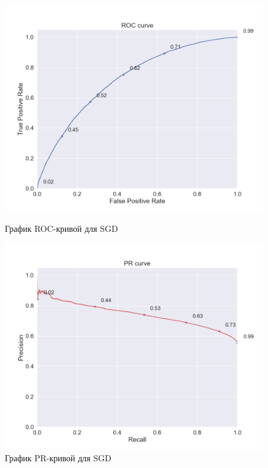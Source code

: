 \begin{figure}[h!]
\centering
\begin{minipage}{.5\textwidth}
\centering
\includegraphics[width=1.0\linewidth]{images/sgd/roc_curve}
\caption{График ROC-кривой для SGD}
\label{fig:sgd_roc}
\end{minipage}%
\begin{minipage}{.5\textwidth}
\centering
\includegraphics[width=1.0\linewidth]{images/sgd/pr_curve}
\caption{График PR-кривой для SGD}
\label{fig:sgd_pr}
\end{minipage}
\end{figure}

